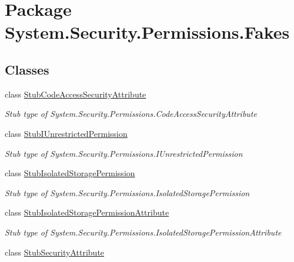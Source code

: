 \hypertarget{namespace_system_1_1_security_1_1_permissions_1_1_fakes}{\section{Package System.\-Security.\-Permissions.\-Fakes}
\label{namespace_system_1_1_security_1_1_permissions_1_1_fakes}
}
\subsection*{Classes}
\begin{DoxyCompactItemize}
\item 
class \hyperlink{class_system_1_1_security_1_1_permissions_1_1_fakes_1_1_stub_code_access_security_attribute}{Stub\-Code\-Access\-Security\-Attribute}
\begin{DoxyCompactList}\small\item\em Stub type of System.\-Security.\-Permissions.\-Code\-Access\-Security\-Attribute\end{DoxyCompactList}\item 
class \hyperlink{class_system_1_1_security_1_1_permissions_1_1_fakes_1_1_stub_i_unrestricted_permission}{Stub\-I\-Unrestricted\-Permission}
\begin{DoxyCompactList}\small\item\em Stub type of System.\-Security.\-Permissions.\-I\-Unrestricted\-Permission\end{DoxyCompactList}\item 
class \hyperlink{class_system_1_1_security_1_1_permissions_1_1_fakes_1_1_stub_isolated_storage_permission}{Stub\-Isolated\-Storage\-Permission}
\begin{DoxyCompactList}\small\item\em Stub type of System.\-Security.\-Permissions.\-Isolated\-Storage\-Permission\end{DoxyCompactList}\item 
class \hyperlink{class_system_1_1_security_1_1_permissions_1_1_fakes_1_1_stub_isolated_storage_permission_attribute}{Stub\-Isolated\-Storage\-Permission\-Attribute}
\begin{DoxyCompactList}\small\item\em Stub type of System.\-Security.\-Permissions.\-Isolated\-Storage\-Permission\-Attribute\end{DoxyCompactList}\item 
class \hyperlink{class_system_1_1_security_1_1_permissions_1_1_fakes_1_1_stub_security_attribute}{Stub\-Security\-Attribute}

\end{DoxyCompactItemize}
